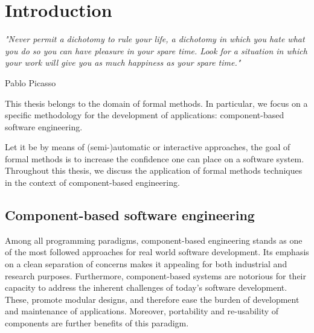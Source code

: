 
\chapter{Introduction} 
\label{chap:intro} 
\epigraph{\textit{"Never permit a dichotomy to rule your life, a dichotomy in which you hate what you do so you can have pleasure in your spare time. Look for a situation in which your work will give you as much happiness as your spare time."}}{Pablo Picasso}

\minitoc




		This thesis belongs to the domain of formal methods. In particular, we focus on a specific methodology
	for the development of applications: component-based software engineering. 
	
		Let it be by means of (semi-)automatic or interactive approaches, the goal of formal methods
	is to increase the confidence one can place on a software system. Throughout this thesis, 	
	we discuss the application of formal methods techniques in the context of 
	component-based engineering.     	
	


\section{Component-based software engineering}
\label{sec:cbse}


	Among all programming paradigms, component-based engineering stands as one of the 
	most followed approaches for real world software development.  Its emphasis on a clean separation 
	of concerns makes it appealing for both industrial and research purposes.
	Furthermore, component-based systems are notorious for their capacity to address the inherent 
	challenges of today's software development.  These, promote modular designs,
	and therefore ease the burden of development and maintenance of applications. Moreover, portability 
	and re-usability of components are further benefits of this paradigm.

